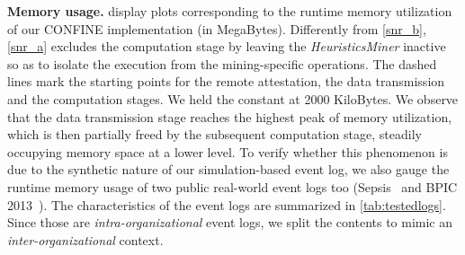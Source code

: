 \noindent\textbf{Memory usage.} \label{sec:evaluation:subsec:MemoryUsage} %
 display plots corresponding to the runtime memory utilization of our CONFINE implementation (in MegaBytes). Differently from \cref{snr_b}, \cref{snr_a} excludes the computation stage by leaving the \emph{HeuristicsMiner} inactive so as to isolate the execution from the mining-specific operations. %
The dashed lines mark %
the starting points for the remote attestation, the data transmission and the computation stages. %
We held the {\SegSize} constant at \num{2000} KiloBytes. %
We observe that the data transmission stage reaches the highest peak of memory utilization, %
which is then partially freed by the subsequent computation stage, steadily occupying memory space at a lower level. %
To verify whether this phenomenon is due to the synthetic nature of our simulation-based event log, we also gauge the runtime memory usage of two public real-world event logs too (Sepsis~\citep{seps} and BPIC 2013~\citep{bpic2013}). %
The characteristics of the event logs are summarized in \cref{tab:testedlogs}.
Since those are \textit{intra-organizational} event logs, we %
split the contents to mimic an \textit{inter-organizational} context.
